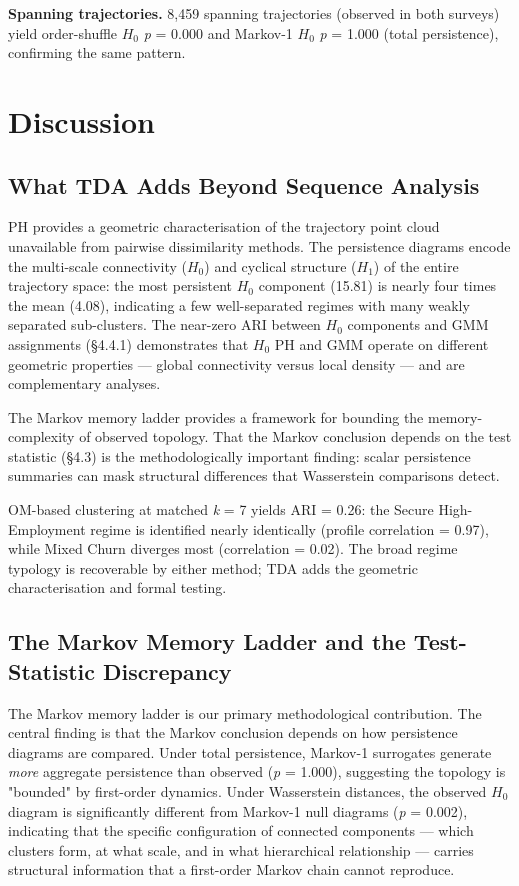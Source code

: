 \textbf{Spanning trajectories.} 8,459 spanning trajectories (observed in both surveys) yield order-shuffle $H_0$ \textit{p} = 0.000 and Markov-1 $H_0$ \textit{p} = 1.000 (total persistence), confirming the same pattern.


\section{Discussion}

\subsection{What TDA Adds Beyond Sequence Analysis}

PH provides a geometric characterisation of the trajectory point cloud unavailable from pairwise dissimilarity methods. The persistence diagrams encode the multi-scale connectivity ($H_0$) and cyclical structure ($H_1$) of the entire trajectory space: the most persistent $H_0$ component (15.81) is nearly four times the mean (4.08), indicating a few well-separated regimes with many weakly separated sub-clusters. The near-zero ARI between $H_0$ components and GMM assignments (\S4.4.1) demonstrates that $H_0$ PH and GMM operate on different geometric properties --- global connectivity versus local density --- and are complementary analyses.

The Markov memory ladder provides a framework for bounding the memory-complexity of observed topology. That the Markov conclusion depends on the test statistic (\S4.3) is the methodologically important finding: scalar persistence summaries can mask structural differences that Wasserstein comparisons detect.

OM-based clustering at matched \textit{k} = 7 yields ARI = 0.26: the Secure High-Employment regime is identified nearly identically (profile correlation = 0.97), while Mixed Churn diverges most (correlation = 0.02). The broad regime typology is recoverable by either method; TDA adds the geometric characterisation and formal testing.

\subsection{The Markov Memory Ladder and the Test-Statistic Discrepancy}

The Markov memory ladder is our primary methodological contribution. The central finding is that the Markov conclusion depends on how persistence diagrams are compared. Under total persistence, Markov-1 surrogates generate \textit{more} aggregate persistence than observed (\textit{p} = 1.000), suggesting the topology is "bounded" by first-order dynamics. Under Wasserstein distances, the observed $H_0$ diagram is significantly different from Markov-1 null diagrams (\textit{p} = 0.002), indicating that the specific configuration of connected components --- which clusters form, at what scale, and in what hierarchical relationship --- carries structural information that a first-order Markov chain cannot reproduce.

